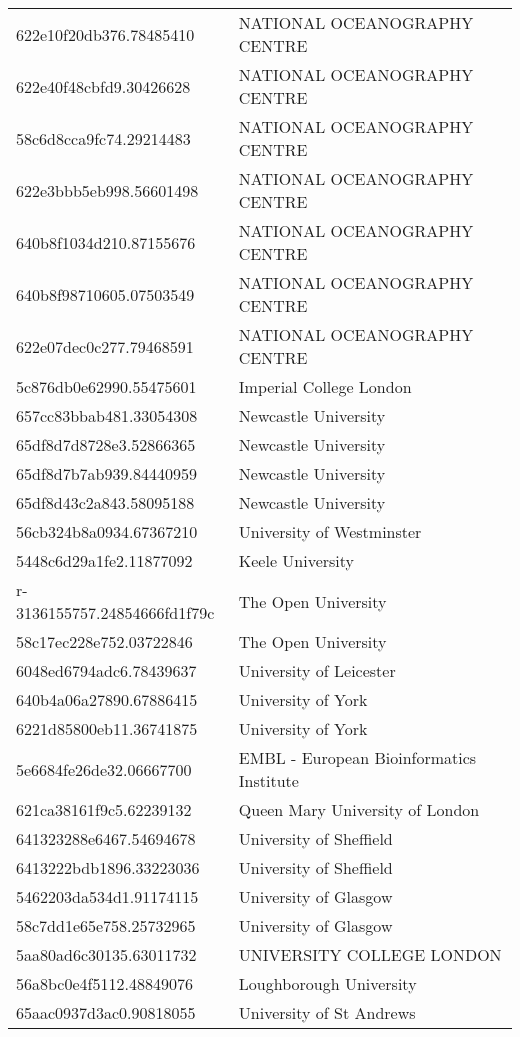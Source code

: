 \begin{tabular}{ll}
622e10f20db376.78485410 & NATIONAL OCEANOGRAPHY CENTRE \\
622e40f48cbfd9.30426628 & NATIONAL OCEANOGRAPHY CENTRE \\
58c6d8cca9fc74.29214483 & NATIONAL OCEANOGRAPHY CENTRE \\
622e3bbb5eb998.56601498 & NATIONAL OCEANOGRAPHY CENTRE \\
640b8f1034d210.87155676 & NATIONAL OCEANOGRAPHY CENTRE \\
640b8f98710605.07503549 & NATIONAL OCEANOGRAPHY CENTRE \\
622e07dec0c277.79468591 & NATIONAL OCEANOGRAPHY CENTRE \\
5c876db0e62990.55475601 & Imperial College London \\
657cc83bbab481.33054308 & Newcastle University \\
65df8d7d8728e3.52866365 & Newcastle University \\
65df8d7b7ab939.84440959 & Newcastle University \\
65df8d43c2a843.58095188 & Newcastle University \\
56cb324b8a0934.67367210 & University of Westminster \\
5448c6d29a1fe2.11877092 & Keele University \\
r-3136155757.24854666fd1f79c & The Open University \\
58c17ec228e752.03722846 & The Open University \\
6048ed6794adc6.78439637 & University of Leicester \\
640b4a06a27890.67886415 & University of York \\
6221d85800eb11.36741875 & University of York \\
5e6684fe26de32.06667700 & EMBL - European Bioinformatics Institute \\
621ca38161f9c5.62239132 & Queen Mary University of London \\
641323288e6467.54694678 & University of Sheffield \\
6413222bdb1896.33223036 & University of Sheffield \\
5462203da534d1.91174115 & University of Glasgow \\
58c7dd1e65e758.25732965 & University of Glasgow \\
5aa80ad6c30135.63011732 & UNIVERSITY COLLEGE LONDON \\
56a8bc0e4f5112.48849076 & Loughborough University \\
65aac0937d3ac0.90818055 & University of St Andrews \\

\end{tabular}
